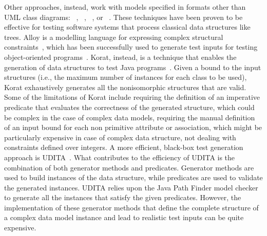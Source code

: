 Other approaches, instead, work with models specified in formats other than UML class diagrams:
~\cite{Boyapati-KORAT-ISSTA-2002,gligoric2010test}, ~\cite{Senni-CPLgeneration-TAP-2012}, ~\cite{Khurshid-SpecificationBasedTesting-ASE-2004}, or ~\cite{Horcher-Z-1995}.
These techniques have been proven to be effective for testing software systems that process classical data structures like trees.
Alloy is a modelling language for expressing complex structural constraints~\cite{Jackson:Alloy:2002},
which has been successfully used to generate test inputs for testing object-oriented programs~\cite{Khurshid-SpecificationBasedTesting-ASE-2004}.
Korat, instead, is a technique that enables the generation of data structures to test Java programs~\cite{Boyapati-KORAT-ISSTA-2002}. Given a bound to the input structures (i.e., the maximum number of instances for each class to be used), Korat exhaustively generates all the nonisomorphic structures that are valid.
Some of the limitations of Korat include requiring the definition of an imperative predicate that evaluates the correctness of the generated structure, which could be complex in the case of complex data models, requiring the manual definition of an input bound for each non primitive attribute or association, which might be particularly expensive in case of complex data structure,  not dealing with constraints defined over integers.
A more efficient, black-box test generation approach is UDITA~\cite{gligoric2010test}.
What contributes to the efficiency of UDITA is the combination of both generator methods and predicates.
Generator methods are used to build instances of the data structure, while predicates are used to validate the generated instances. UDITA relies upon the Java Path Finder model checker~\cite{Visser-JPF-2004} to generate all the instances that satisfy the given predicates. However, the implementation of these generator methods that define the complete structure of a complex data model instance and lead to realistic test inputs can be quite expensive.


